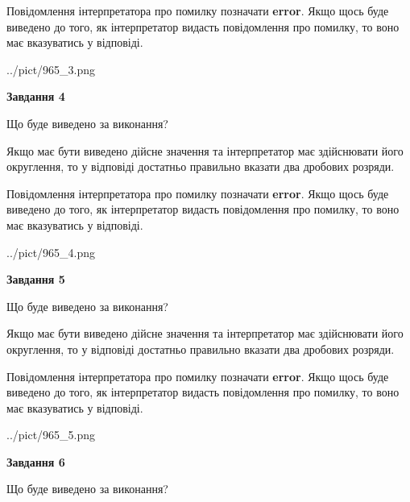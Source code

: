 \documentclass[12pt, ukrainian]{article}
\begin{document}
{\begin {Large}
Повідомлення інтерпретатора про помилку позначати \textbf{error}.
Якщо щось буде виведено до того, як інтерпретатор видасть повідомлення про помилку, 
то воно має вказуватись у відповіді. \par

\begin{center}
	{../pict/965_3.png}
\end{center}
\newpage

{\begin {center}\textbf{Завдання 4}\end {center}}\par
Що буде виведено за виконання? \par

Якщо має бути виведено дійсне значення та інтерпретатор має здійснювати його округлення, 
то у відповіді достатньо правильно вказати два дробових розряди.

Повідомлення інтерпретатора про помилку позначати \textbf{error}.
Якщо щось буде виведено до того, як інтерпретатор видасть повідомлення про помилку, 
то воно має вказуватись у відповіді. \par

\begin{center}
	{../pict/965_4.png}
\end{center}
\newpage

{\begin {center}\textbf{Завдання 5}\end {center}}\par
Що буде виведено за виконання? \par

Якщо має бути виведено дійсне значення та інтерпретатор має здійснювати його округлення, 
то у відповіді достатньо правильно вказати два дробових розряди.

Повідомлення інтерпретатора про помилку позначати \textbf{error}.
Якщо щось буде виведено до того, як інтерпретатор видасть повідомлення про помилку, 
то воно має вказуватись у відповіді. \par

\begin{center}
	{../pict/965_5.png}
\end{center}
\newpage

{\begin {center}\textbf{Завдання 6}\end {center}}\par
Що буде виведено за виконання? \par


\end{Large}}
\end{document}
